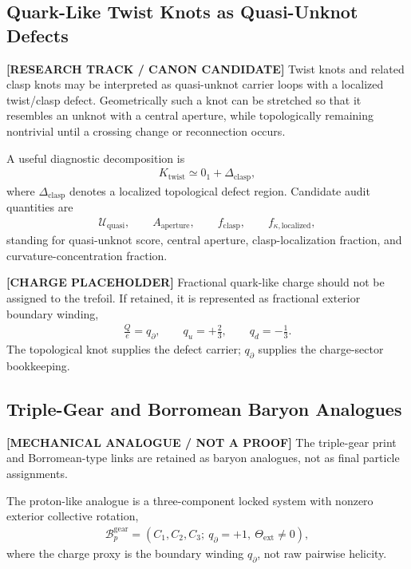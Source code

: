 
\subsection{Quark-Like Twist Knots as Quasi-Unknot Defects}
\label{subsec:rt_quark_twist_quasi_unknot}

\textbf{[RESEARCH TRACK / CANON CANDIDATE]} Twist knots and related clasp knots may be interpreted as quasi-unknot carrier loops with a localized twist/clasp defect. Geometrically such a knot can be stretched so that it resembles an unknot with a central aperture, while topologically remaining nontrivial until a crossing change or reconnection occurs.

A useful diagnostic decomposition is
\begin{align}
    K_{\mathrm{twist}}
    \simeq
    0_1 + \Delta_{\mathrm{clasp}},
\end{align}
where $\Delta_{\mathrm{clasp}}$ denotes a localized topological defect region. Candidate audit quantities are
\begin{align}
    \mathcal{U}_{\mathrm{quasi}},\qquad
    A_{\mathrm{aperture}},\qquad
    f_{\mathrm{clasp}},\qquad
    f_{\kappa,\mathrm{localized}},
\end{align}
standing for quasi-unknot score, central aperture, clasp-localization fraction, and curvature-concentration fraction.

\textbf{[CHARGE PLACEHOLDER]} Fractional quark-like charge should not be assigned to the trefoil. If retained, it is represented as fractional exterior boundary winding,
\begin{align}
    \frac{Q}{e}=q_{\partial},
    \qquad
    q_u=+\frac{2}{3},
    \qquad
    q_d=-\frac{1}{3}.
\end{align}
The topological knot supplies the defect carrier; $q_{\partial}$ supplies the charge-sector bookkeeping.

\subsection{Triple-Gear and Borromean Baryon Analogues}
\label{subsec:rt_triple_gear_borromean_baryons}

\textbf{[MECHANICAL ANALOGUE / NOT A PROOF]} The triple-gear print and Borromean-type links are retained as baryon analogues, not as final particle assignments.

The proton-like analogue is a three-component locked system with nonzero exterior collective rotation,
\begin{align}
    \mathcal{B}_{p}^{\mathrm{gear}}
    =
    (C_1,C_2,C_3;\ q_{\partial}=+1,\ \Theta_{\mathrm{ext}}\neq 0),
\end{align}
where the charge proxy is the boundary winding $q_{\partial}$, not raw pairwise helicity.

